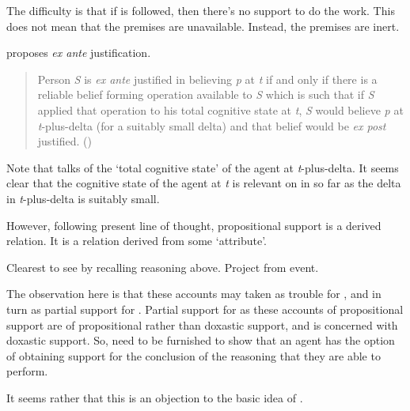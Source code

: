 \begin{note}[Note]
  The difficulty is that if \citeauthor{Turri:2010aa} is followed, then there's no support to do the work.
  This does not mean that the premises are unavailable.
  Instead, the premises are inert.
\end{note}

\begin{note}
  \citeauthor{Goldman:1979ui} proposes \emph{ex ante} justification.
  \begin{quote}
    Person \emph{S} is \emph{ex ante} justified in believing \emph{p} at \emph{t} if and only if there is a reliable belief forming operation available to \emph{S} which is such that if \emph{S} applied that operation to his total cognitive state at \emph{t}, \emph{S} would believe \emph{p} at \emph{t}-plus-delta (for a suitably small delta) and that belief would be \emph{ex post} justified.\nolinebreak
    \mbox{}\hfill\mbox{(\citeauthor[21]{Goldman:1979ui})}
  \end{quote}
  Note that \citeauthor{Goldman:1979ui} talks of the `total cognitive state' of the agent at \emph{t}-plus-delta.
  It seems clear that the cognitive state of the agent at \emph{t} is relevant on in so far as the delta in \emph{t}-plus-delta is suitably small.
\end{note}

\begin{note}[Example?]
  However, following present line of thought, propositional support is a derived relation.
  It is a relation derived from some `attribute'.

  Clearest to see by recalling reasoning above.
  Project from event.
\end{note}

\begin{note}
  The observation here is that these accounts may taken as trouble for \WR{}, and in turn as partial support for \AR{}.
  Partial support for \AR{} as these accounts of propositional support are of propositional rather than doxastic support, and \AR{} is concerned with doxastic support.
  So, need to be furnished to show that an agent has the option of obtaining support for the conclusion of the reasoning that they are able to perform.

  It seems rather that this is an objection to the basic idea of \WR{}.
\end{note}

